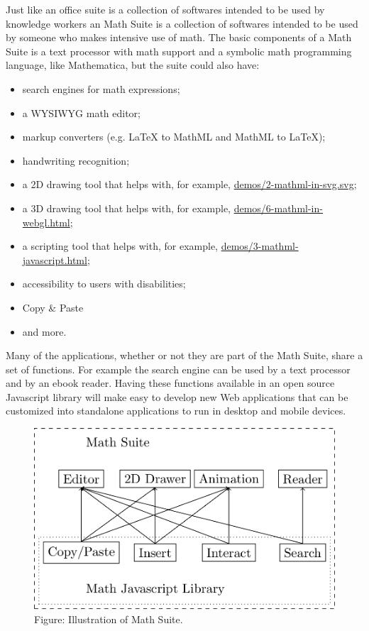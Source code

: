 Just like an office suite is a collection of softwares intended to be used by
knowledge workers an Math Suite is a collection of softwares intended to be used
by someone who makes intensive use of math. The basic components of a Math
Suite is a text processor with math support and a symbolic math programming
language, like Mathematica, but the suite could also have:
\begin{itemize}
  \item search engines for math expressions;
  \item a WYSIWYG math editor;
  \item markup converters (e.g. LaTeX to MathML and MathML to LaTeX);
  \item handwriting recognition;
  \item a 2D drawing tool that helps with, for example,
    \href{http://fred-wang.github.io/MathUI2014/demos/2-mathml-in-svg.svg}{demos/2-mathml-in-svg.svg};
  \item a 3D drawing tool that helps with, for example,
    \href{http://fred-wang.github.io/MathUI2014/demos/6-mathml-in-webgl.html}{demos/6-mathml-in-webgl.html};
  \item a scripting tool that helps with, for example,
    \href{http://fred-wang.github.io/MathUI2014/demos/3-mathml-javascript.html}{demos/3-mathml-javascript.html};
  \item accessibility to users with disabilities;
  \item Copy \& Paste
  \item and more.
\end{itemize}

Many of the applications, whether or not they are part of the Math Suite,
share a set of functions. For
example the search engine can be used by a text processor and by an ebook
reader. Having
these functions available in an open source Javascript library will make easy to
develop new Web applications that can be customized into standalone applications
to run in desktop and mobile devices.

\begin{figure}[!htb]
  \centering
  \includegraphics[width=.5\textwidth]{math-suite-diagram.png} \\
  Figure: Illustration of Math Suite.
\end{figure}

